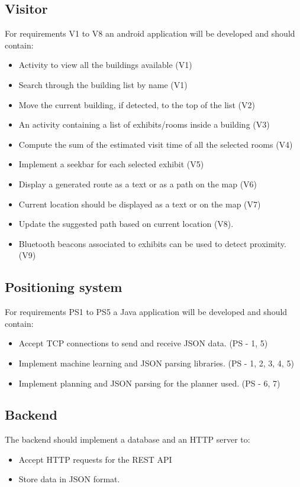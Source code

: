 \subsection{Visitor}
For requirements V1 to V8 an android application will be developed and should contain:
	\begin{itemize}
		\item Activity to view all the buildings available (V1)
		\item Search through the building list by name (V1)
		\item Move the current building, if detected, to the top of the list (V2)
		\item An activity containing a list of exhibits/rooms inside a building (V3)
		\item Compute the sum of the estimated visit time of all the selected rooms (V4)
		\item Implement a seekbar for each selected exhibit (V5)
		\item Display a generated route as a text or as a path on the map (V6)
		\item Current location should be displayed as a text or on the map (V7)
		\item Update the suggested path based on current location (V8).
		\item Bluetooth beacons associated to exhibits can be used to detect proximity. (V9)
	\end{itemize}

\subsection{Positioning system}
For requirements PS1 to PS5 a Java application will be developed and should contain:
	\begin{itemize}
		\item Accept TCP connections to send and receive JSON data. (PS - 1, 5)
		\item Implement machine learning and JSON parsing libraries. (PS - 1, 2, 3, 4, 5)
		\item Implement planning and JSON parsing for the planner used. (PS - 6, 7)
	\end{itemize}

\subsection{Backend}
The backend should implement a database and an HTTP server to:
	\begin{itemize}
		\item Accept HTTP requests for the REST API
		\item Store data in JSON format.
	\end{itemize}


